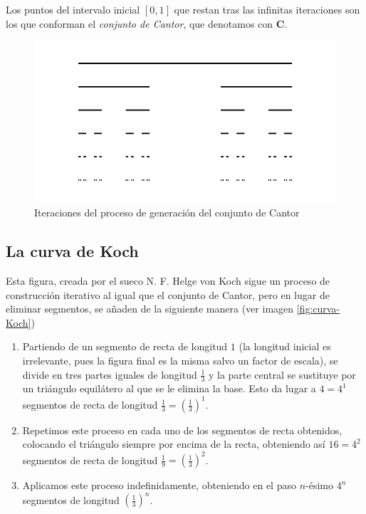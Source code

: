 Los puntos del intervalo inicial $[0,1]$ que restan tras las infinitas iteraciones son los que conforman el \textit{conjunto de Cantor}, que denotamos con $\textbf{C}$.

\begin{figure} [h]
\centering
\includegraphics[scale = 0.5]{img/cantor.png}
\caption{Iteraciones del proceso de generación del conjunto de Cantor}
 \label{fig:Cantor}
\end{figure}

\subsection{La curva de Koch}
\label{subsection:curva-Koch}

Esta figura, creada por el sueco N. F. Helge von Koch sigue un proceso de construcción iterativo al igual que el conjunto de Cantor, pero en lugar de eliminar segmentos, se añaden de la siguiente manera (ver imagen \ref{fig:curva-Koch})

\begin{enumerate}
\item Partiendo de un segmento de recta de longitud $1$ (la longitud inicial es irrelevante, pues la figura final es la misma salvo un factor de escala), se divide en tres partes iguales de longitud $\frac 1 3$ y la parte central se sustituye por un triángulo equilátero al que se le elimina la base. Esto da lugar a $4=4^1$ segmentos de recta de longitud $\frac 1 3=\left(\frac 1 3\right)^1$.

\item Repetimos este proceso en cada uno de los segmentos de recta obtenidos, colocando el triángulo siempre por encima de la recta, obteniendo así $16=4^2$ segmentos de recta de longitud $\frac 1 9=\left(\frac 1 3\right)^2$.

\item Aplicamos este proceso indefinidamente, obteniendo en el paso $n$-ésimo $4^n$ segmentos de longitud $\left(\frac 1 3\right)^n$. 
\end{enumerate}

